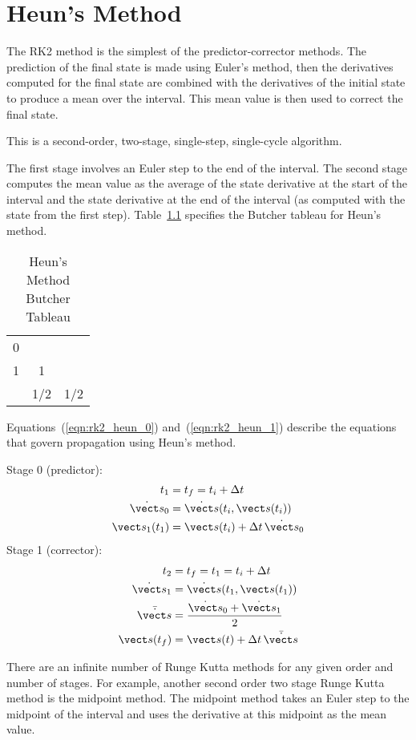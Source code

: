 \chapter{Heun's Method}\label{app:rk2heun}

The RK2 method is the simplest of the predictor-corrector methods.  The
prediction of the final state is made using Euler's method, then the
derivatives computed for the final state are combined with the derivatives of
the initial state to produce a mean over the interval.  This mean value is
then used to correct the final state.

 This is a second-order, two-stage, single-step, single-cycle algorithm.

The first stage involves an Euler step to the end of the interval.
The second stage computes the mean value as the average of
the state derivative at the start of the interval and
the state derivative at the end of the interval
(as computed with the state from the first step).
Table~\ref{tab:heun_butcher} specifies the Butcher tableau for Heun's method.

\begin{table}[htp]
\centering
\caption{Heun's Method Butcher Tableau}
\label{tab:heun_butcher}
\vspace{1.5ex}
\begin{tabular}{c|cc}
0 && \\
1 & 1 & \\
\hline
& 1/2 & 1/2
\end{tabular}
\end{table}

Equations~(\ref{eqn:rk2_heun_0}) and~(\ref{eqn:rk2_heun_1}) describe
the equations that govern propagation using Heun's method.

Stage 0 (predictor):
\begin{equation}
\label{eqn:rk2_heun_0}
\begin{split}
t_1 &= t_f = t_i + \Delta t \\
\dot{\vect s}_0 &= \dot{\vect s}(t_i,\vect s(t_i)) \\
\vect s_1(t_1) &= \vect s(t_i) +  \Delta t\, \dot{\vect s}_0
\end{split}
\end{equation}
Stage 1 (corrector):
\begin{equation}
\label{eqn:rk2_heun_1}
\begin{split}
t_2 &= t_f = t_1 = t_i + \Delta t \\
\dot{\vect s}_1 &= \dot{\vect s}(t_1,\vect s(t_1)) \\
\bar {\dot{\vect s}} &= \frac{\dot{\vect s}_0+\dot{\vect s}_1} 2 \\
\vect s(t_f) &= \vect s(t) + \Delta t\, \bar {\dot{\vect s}}
\end{split}
\end{equation}

There are an infinite number of Runge Kutta methods for
any given order and number of stages.
For example, another second order two stage Runge Kutta method
is the midpoint method.
The midpoint method takes an Euler step to the midpoint of the
interval and uses the derivative at this midpoint as the mean value.

